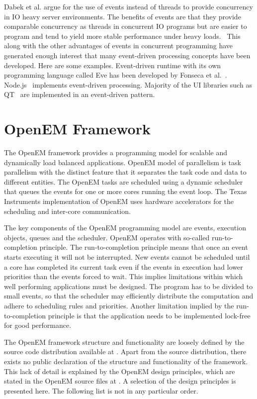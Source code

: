 Dabek et al. argue for the use of events instead of threads to provide concurrency in IO heavy server environments. The benefits of events are that they provide comparable concurrency as threads in concurrent IO programs but are easier to program and tend to yield more stable performance under heavy loads.~\cite{dabek2002event} This along with the other advantages of events in concurrent programming have generated enough interest that many event-driven processing concepts have been developed. Here are some examples. Event-driven runtime with its own programming language called Eve has been developed by Fonseca et al.~\cite{fonseca2014eve}. Node.js~\cite{tilkov2010node} implements event-driven processing. Majority of the UI libraries such as QT~\cite{blanchette2006cpp} are implemented in an event-driven pattern.

\section{OpenEM Framework}
\label{sec:emframework}
The OpenEM framework provides a programming model for scalable and dynamically load balanced applications. OpenEM model of parallelism is task parallelism with the distinct feature that it separates the task code and data to different entities. The OpenEM tasks are scheduled using a dynamic scheduler that queues the events for one or more cores running the event loop. The Texas Instruments implementation of OpenEM uses hardware accelerators for the scheduling and inter-core communication.

The key components of the OpenEM programming model are events, execution objects, queues and the scheduler. OpenEM operates with so-called run-to-completion principle. The run-to-completion principle means that once an event starts executing it will not be interrupted. New events cannot be scheduled until a core has completed its current task even if the events in execution had lower priorities than the events forced to wait. This implies limitations within which well performing applications must be designed. The program has to be divided to small events, so that the scheduler may efficiently distribute the computation and adhere to scheduling rules and priorities. Another limitation implied by the run-to-completion principle is that the application needs to be implemented lock-free for good performance.~\cite{openempage}

The OpenEM framework structure and functionality are loosely defined by the source code distribution available at \cite{openempage}. Apart from the source distribution, there exists no public declaration of the structure and functionality of the framework. This lack of detail is explained by the OpenEM design principles, which are stated in the OpenEM source files at \cite{openempage}. A selection of the design principles is presented here. The following list is not in any particular order.

